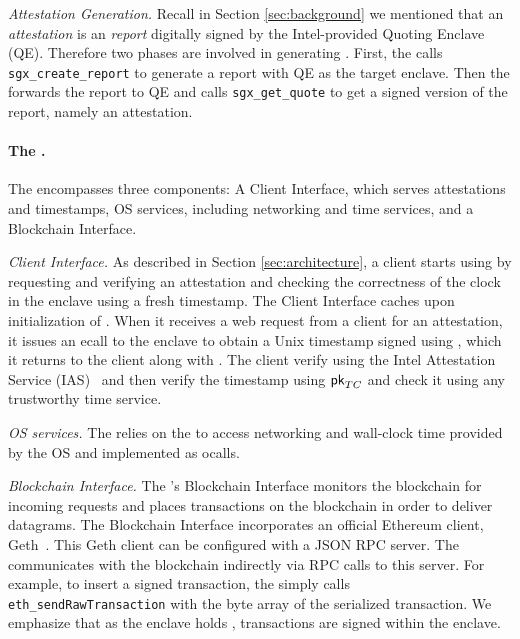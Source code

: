 \noindent\emph{Attestation Generation.} Recall in Section \ref{sec:background}
we mentioned that an \emph{attestation} is an \emph{report} digitally signed by
the Intel-provided Quoting Enclave (QE).  Therefore two phases are involved in
generating \att. First, the \encname calls \texttt{sgx\_create\_report} to
generate a report with QE as the target enclave. Then the \medname forwards the
report to QE and calls \texttt{sgx\_get\_quote} to get a signed version of the
report, namely an attestation.

\paragraph{The \medname.} The \medname encompasses three components: A Client Interface, which serves attestations and timestamps, OS services, including networking and time services, and a Blockchain Interface. 

\vspace{2mm}

\noindent\emph{Client Interface.} As described in Section \ref{sec:architecture},
a client starts using \tc by requesting and verifying an attestation \att and checking the correctness of the clock in the \tc enclave using a fresh timestamp.
The Client Interface caches \att upon initialization of \engine. When it receives a web request from a client for an attestation,
it issues an ecall to the enclave to obtain a
Unix timestamp signed using \skTC, which it returns to the client along with \att. The client verify \att 
using the Intel Attestation Service (IAS)~\cite{} and then verify the timestamp using ${\sf pk}_{TC}$ and check it using any trustworthy time service. 

\vspace{2mm}

\noindent\emph{OS services.} The \encname relies on the \medname to access networking and 
wall-clock time provided by the OS and implemented as ocalls.

\vspace{2mm}

\noindent\emph{Blockchain Interface.} The \medname's Blockchain Interface monitors the
blockchain for incoming requests and places transactions on the blockchain in order to
deliver datagrams. The Blockchain Interface incorporates an 
official Ethereum client, Geth~\cite{geth}. This Geth client can be configured with a JSON RPC server.  
The \medname  communicates with the blockchain indirectly via RPC calls to this server. For example, to insert a signed transaction, the \medname simply calls
\texttt{eth\_sendRawTransaction} with the byte array of the serialized
transaction. We emphasize that as the enclave holds \skTC, transactions are signed within the enclave.


